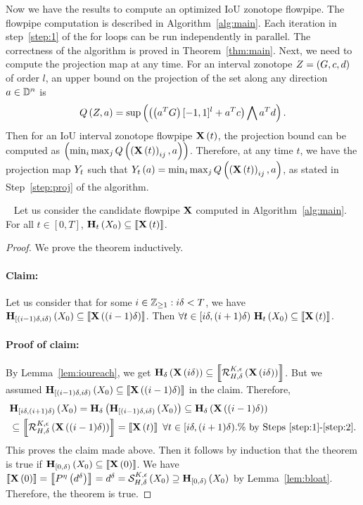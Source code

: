 Now we have the results to compute an optimized IoU zonotope flowpipe.
The flowpipe computation is described in Algorithm~\ref{alg:main}.
Each iteration in step~\ref{step:1} of the for loops can be run
independently in parallel.  The correctness of the algorithm is proved
in Theorem~\ref{thm:main}.  Next, we need to compute the projection
map at any time.  For an interval zonotope $Z
= \left(G,c,d\right)$ of order $l$, an upper bound on the
projection of the set along any direction $a\in\mathbb{D}^n$ is
%
\[
Q\left(Z,a\right) = \sup\left(\left(\left(a^TG\right)[-1,1]^l+a^Tc\right)\bigwedge a^Td\right).
\]
%
Then for an IoU interval zonotope flowpipe $\mathbf{X}\left(t\right)$, the projection
bound can be computed as
$\left(\min_i\max_jQ\left(\left(\mathbf{X}\left(t\right)\right)_{ij},a\right)\right)$.  Therefore, at any
time $t$, we have the projection map $Y_{t}$ such that
$Y_{t}\left(a\right) = \min_i\max_jQ\left(\left(\mathbf{X}\left(t\right)\right)_{ij},a\right)$,
as stated in Step~\ref{step:proj} of the algorithm.
%
\begin{theorem}~\label{thm:main}
Let us consider the candidate flowpipe $\mathbf{X}$ computed in
Algorithm~\ref{alg:main}.  For all $t\in[0,T]$,
$\mathbf{H}_{t}\left(X_0\right)\subseteq \left\llbracket{\mathbf{X}\left(t\right)}\right\rrbracket$.
\end{theorem}
%
\begin{proof}
We prove the theorem inductively.

\paragraph{Claim:}  Let us consider that for some
$i\in\mathbb{Z}_{\geq 1}:i\delta<T$, we have
$\mathbf{H}_{[(i-1)\delta,i\delta)}\left(X_0\right)\subseteq\left\llbracket{\mathbf{X}\left((i-1)\delta\right)}\right\rrbracket$.
Then $\forall
t\in[i\delta,(i+1)\delta)~\mathbf{H}_{t}\left(X_0\right)\subseteq {\left\llbracket{\mathbf{X}\left(t\right)}\right\rrbracket}$.

\paragraph{Proof of claim:}
By Lemma~\ref{lem:ioureach}, we get
$\mathbf{H}_{\delta}\left(\mathbf{X}\left(i\delta\right)\right)\subseteq \left\llbracket{\mathcal{R}_{H,\delta}^{K,\epsilon}\left(\mathbf{X}\left(i\delta\right)\right)}\right\rrbracket$.
But we assumed
$\mathbf{H}_{[(i-1)\delta,i\delta)}\left(X_0\right)\subseteq\left\llbracket{\mathbf{X}\left((i-1)\delta\right)}\right\rrbracket$
in the claim.  Therefore,
%
\begin{align*}
& \mathbf{H}_{[i\delta,(i+1)\delta)}\left(X_0\right)
= \mathbf{H}_{\delta}\left(\mathbf{H}_{[(i-1)\delta,i\delta)}\left(X_0\right)\right) \subseteq \mathbf{H}_{\delta}\left(\mathbf{X}\left((i-1)\delta\right)\right)\\
&\subseteq \left\llbracket{\mathcal{R}_{H,\delta}^{K,\epsilon}\left(\mathbf{X}\left((i-1)\delta\right)\right)}\right\rrbracket
= \left\llbracket{\mathbf{X}\left(t\right)}\right\rrbracket~\forall t\in[i\delta,(i+1)\delta).\%~\text{by
Steps~\ref{step:1}-\ref{step:2}.}
\end{align*}
%
This proves the claim made above.
%
Then it follows by induction that the theorem is true if
$\mathbf{H}_{[0,\delta)}\left(X_0\right)\subseteq \left\llbracket{\mathbf{X}\left(0\right)}\right\rrbracket$.  We have
$\left\llbracket{\mathbf{X}\left(0\right)}\right\rrbracket = \left\llbracket{P^{\eta}\left(d^\delta\right)}\right\rrbracket
= d^\delta
= \mathcal{S}_{H,\delta}^{K,\epsilon}\left(X_0\right)\supseteq \mathbf{H}_{[0,\delta)}\left(X_0\right)$
by Lemma~\ref{lem:bloat}.  Therefore, the theorem is true.
\end{proof}
